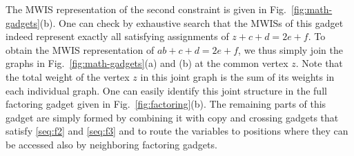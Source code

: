 The MWIS representation of the second constraint is given in Fig.~\ref{fig:math-gadgets}(b). One can check by exhaustive search that the MWISs of this gadget indeed represent exactly all satisfying assignments of $z+c+d=2e+f$. To obtain the MWIS representation of $ab+c+d=2e+f$, we thus simply join the graphs in Fig.~\ref{fig:math-gadgets}(a) and (b) at the common vertex $z$. Note that the total weight of the vertex $z$ in this joint graph is the sum of its weights in each individual graph. One can easily identify this joint structure in the full factoring gadget given in Fig.~\ref{fig:factoring}(b). The remaining parts of this gadget are simply formed by combining it with copy and crossing gadgets that satisfy \eqref{seq:f2} and \eqref{seq:f3} and to route the variables to positions where they can be accessed also by neighboring factoring gadgets.



%


